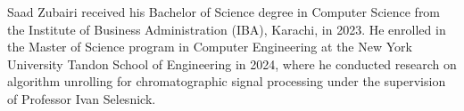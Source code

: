 
Saad Zubairi received his Bachelor of Science degree in Computer Science from the Institute of Business Administration (IBA), Karachi, in 2023. He enrolled in the Master of Science program in Computer Engineering at the New York University Tandon School of Engineering in 2024, where he conducted research on algorithm unrolling for chromatographic signal processing under the supervision of Professor Ivan Selesnick.

